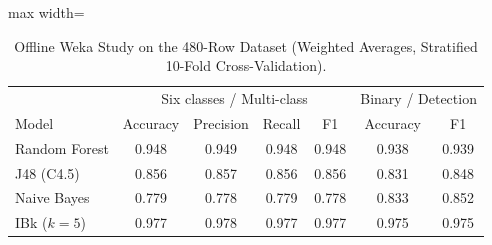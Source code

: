 \documentclass[sigconf,screen]{acmart}
\begin{document}
\begin{table}[tbp]
\centering
\small
\caption{Offline Weka Study on the 480-Row Dataset (Weighted Averages, Stratified 10-Fold Cross-Validation).}
\label{tab:ml}
\begin{adjustbox}{max width=\columnwidth}
\begin{tabular}{l c c c c c c}
\toprule
 & \multicolumn{4}{c}{Six classes / Multi-class} & \multicolumn{2}{c}{Binary / Detection} \\
Model & Accuracy & Precision & Recall & F1 & Accuracy & F1 \\
\midrule
Random Forest & 0.948 & 0.949 & 0.948 & 0.948 & 0.938 & 0.939 \\
J48 (C4.5)    & 0.856 & 0.857 & 0.856 & 0.856 & 0.831 & 0.848 \\
Naive Bayes   & 0.779 & 0.778 & 0.779 & 0.778 & 0.833 & 0.852 \\
IBk ($k=5$)   & 0.977 & 0.978 & 0.977 & 0.977 & 0.975 & 0.975 \\
\bottomrule
\end{tabular}
\end{adjustbox}
\end{table}
\end{document}
